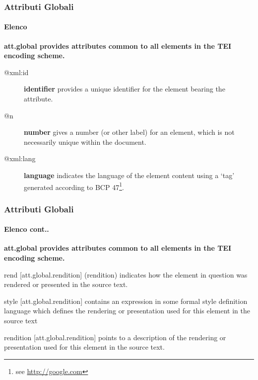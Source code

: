 
\begin{frame}
    \frametitle{Attributi Globali}
    \framesubtitle{Elenco}
    \addtocounter{nframe}{1}


\textbf{\textrm{att.global} provides attributes common to all elements in the TEI encoding scheme.}

\begin{description}
    \item [@xml:id]     \textbf{identifier} provides a unique identifier for the element bearing the attribute.
    \item [@n]          \textbf{number} gives a number (or other label) for an element, which is not necessarily unique within the document.
    \item [@xml:lang]   \textbf{language} indicates the language of the element content using a ‘tag’ generated according to BCP 47\footnote{see \href{http://google.con}{http://google.com}}.
\end{description}

\end{frame}


\begin{frame}
    \frametitle{Attributi Globali}
    \framesubtitle{Elenco cont..}
    \addtocounter{nframe}{1}


\textbf{\textmd{att.global} provides attributes common to all elements in the TEI encoding scheme.}

\begin{description}
    \item rend [att.global.rendition]	(rendition) indicates how the element in question was rendered or presented in the source text.
    \item style [att.global.rendition]	contains an expression in some formal style definition language which defines the rendering or presentation used for this element in the source text
    \item rendition [att.global.rendition]	points to a description of the rendering or presentation used for this element in the source text.
\end{description}

\end{frame}

